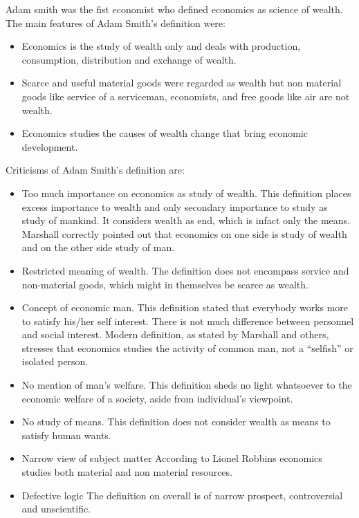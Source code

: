 \documentclass[11pt,]{book}
\providecommand{\tightlist}{%
  \setlength{\itemsep}{0pt}\setlength{\parskip}{0pt}}
\theoremstyle{definition}
\theoremstyle{definition}
\theoremstyle{definition}
\theoremstyle{remark}
\begin{document}
Adam smith was the fist economist who defined economics as science of
wealth. The main features of Adam Smith's definition were:

\begin{itemize}
\tightlist
\item
  Economics is the study of wealth only and deals with production,
  consumption, distribution and exchange of wealth.
\item
  Scarce and useful material goods were regarded as wealth but non
  material goods like service of a serviceman, economists, and free
  goods like air are not wealth.
\item
  Economics studies the causes of wealth change that bring economic
  development.
\end{itemize}

Criticisms of Adam Smith's definition are:

\begin{itemize}
\tightlist
\item
  Too much importance on economics as study of wealth. \newline This
  definition places excess importance to wealth and only secondary
  importance to study as study of mankind. It considers wealth as end,
  which is infact only the means. Marshall correctly pointed out that
  economics on one side is study of wealth and on the other side study
  of man.
\item
  Restricted meaning of wealth. \newline The definition does not
  encompass service and non-material goods, which might in themselves be
  scarce as wealth.
\item
  Concept of economic man. \newline This definition stated that
  everybody works more to satisfy his/her self interest. There is not
  much difference between personnel and social interest. Modern
  definition, as stated by Marshall and others, stresses that economics
  studies the activity of common man, not a ``selfish'' or isolated
  person.
\item
  No mention of man's welfare. \newline This definition sheds no light
  whatsoever to the economic welfare of a society, aside from
  individual's viewpoint.
\item
  No study of means. \newline This definition does not consider wealth
  as means to satisfy human wants.
\item
  Narrow view of subject matter \newline According to Lionel Robbins
  economics studies both material and non material resources.
\item
  Defective logic \newline The definition on overall is of narrow
  prospect, controversial and unscientific.
\end{itemize}
\end{document}
